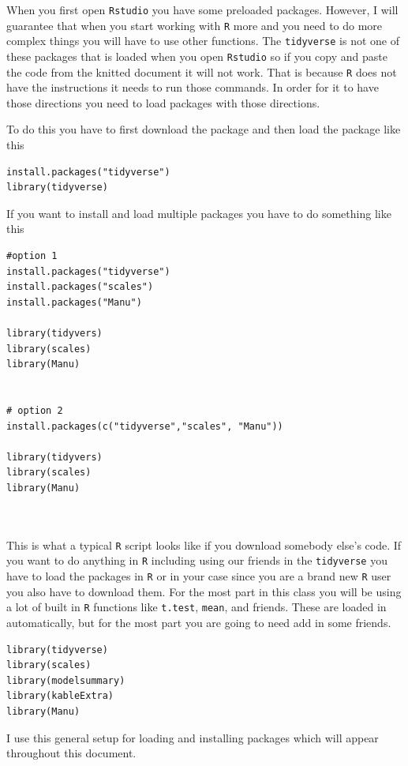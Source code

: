 \documentclass[]{tufte-handout}
\begin{document}
When you first open \texttt{Rstudio} you have some preloaded packages.
However, I will guarantee that when you start working with \texttt{R}
more and you need to do more complex things you will have to use other
functions. The \texttt{tidyverse} is not one of these packages that is
loaded when you open \texttt{Rstudio} so if you copy and paste the code
from the knitted document it will not work. That is because \texttt{R}
does not have the instructions it needs to run those commands. In order
for it to have those directions you need to load packages with those
directions.

To do this you have to first download the package and then load the
package like this

\begin{verbatim}
install.packages("tidyverse")
library(tidyverse)
\end{verbatim}

If you want to install and load multiple packages you have to do
something like this

\begin{verbatim}
#option 1
install.packages("tidyverse")
install.packages("scales")
install.packages("Manu")

library(tidyvers)
library(scales)
library(Manu)


# option 2
install.packages(c("tidyverse","scales", "Manu"))

library(tidyvers)
library(scales)
library(Manu)



\end{verbatim}

This is what a typical \texttt{R} script looks like if you download
somebody else's code. If you want to do anything in \texttt{R} including
using our friends in the \texttt{tidyverse} you have to load the
packages in \texttt{R} or in your case since you are a brand new
\texttt{R} user you also have to download them. For the most part in
this class you will be using a lot of built in \texttt{R} functions like
\texttt{t.test}, \texttt{mean}, and friends. These are loaded in
automatically, but for the most part you are going to need add in some
friends.

\begin{verbatim}
library(tidyverse)
library(scales)
library(modelsummary)
library(kableExtra)
library(Manu)
\end{verbatim}

I use this general setup for loading and installing packages which will
appear throughout this document.
\end{document}
